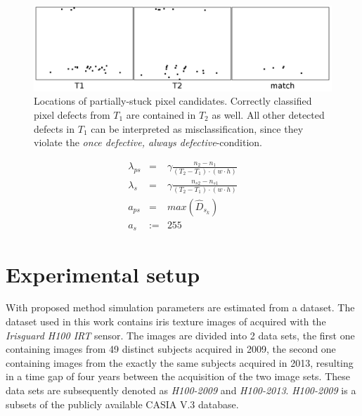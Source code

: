 \documentclass[10pt,twocolumn,letterpaper]{article}
\begin{document}
\begin{figure}
  \centering
  \includegraphics[width=\linewidth]{img/detectedLocations.png}
  \caption{Locations of partially-stuck pixel candidates. Correctly classified pixel defects from $T_1$ are contained in $T_2$ as well. All other detected defects in $T_1$ can be interpreted as misclassification, since they violate the \emph{once defective, always defective}-condition.}
  \label{fig:defectPersistence}
\end{figure}


\begin{eqnarray}
 \lambda_{ps} 	& = 	& \gamma \frac{n_2-n_1}{(T_2-T_1)\cdot(w \cdot h)} \\ 
 \lambda_{s} 	& = 	& \gamma  \frac{n_{s2}-n_{s1}}{(T_2-T_1)\cdot(w \cdot h)} \\
 a_{ps} 	& = 	&max(\hat{D}_{s_k}) \\ 
 a_{s} 		&:= 	& 255
\end{eqnarray}


\section{Experimental setup}
 \label{testing}
 With proposed method simulation parameters are estimated from a dataset. The dataset used in this work contains iris texture images of acquired with the \emph{Irisguard H100 IRT} sensor. The images are divided into 2 data sets, the first one containing images from 49 distinct subjects acquired in 2009, the second one containing images from the exactly the same subjects acquired in 2013, resulting in a time gap of four years between the acquisition of the two image sets. These data sets are subsequently denoted as \emph{H100-2009} and \emph{H100-2013}. \emph{H100-2009} is a subsets of the publicly available CASIA V.3 database.
\end{document}
